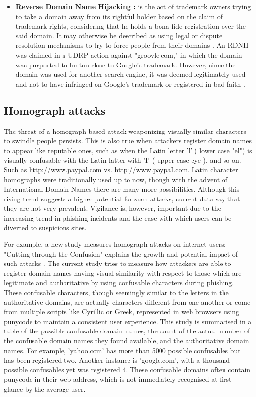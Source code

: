 \begin{itemize}
     \item \textbf{Reverse Domain Name Hijacking  :} is the act of trademark owners trying to take a domain away from its rightful holder based on the claim of trademark rights, considering that he holds a bona fide registration over the said domain. It may otherwise be described as using legal or dispute resolution mechanisms to try to force people from their domains \cite{Sun2006DomainTrademarkConflict}.  An RDNH was claimed in a UDRP action against "groovle.com," in which the domain was purported to be too close to Google's trademark. However, since the domain was used for another search engine, it was deemed legitimately used and not to have infringed on Google's trademark or registered in bad faith \cite{Singh2011ReverseDomainHijacking}.
\end{itemize}


\subsection {Homograph attacks} 

The threat of a homograph based attack weaponizing visually similar characters to swindle people persists. This is also true when attackers register domain names to appear like reputable ones, such as when the Latin letter 'l' ( lower case "el") is visually confusable with the Latin latter with 'I' ( upper case eye ), and so on. Such as http://www.paypal.com vs. http://www.paypaI.com.  Latin character homographs were traditionally used up to now, though with the advent of International Domain Names there are many more possibilities. Although this rising trend suggests a higher potential for such attacks, current data say that they are not very prevalent. Vigilance is, however, important due to the increasing trend in phishing incidents and the ease with which users can be diverted to suspicious sites.

For example, a new study measures homograph attacks on internet users: "Cutting through the Confusion" explains the growth and potential impact of such attacks \cite{holgers2006homograph}. The current study tries to measure how attackers are able to register domain names having visual similarity with respect to those which are legitimate and authoritative by using confusable characters during phishing. These confusable characters, though seemingly similar to the letters in the authoritative domains, are actually characters different from one another or come from multiple scripts like Cyrillic or Greek, represented in web browsers using punycode to maintain a consistent user experience. This study is summarised in a table of the possible confusable domain names, the count of the actual number of the confusable domain names they found available, and the authoritative domain names. For example, 'yahoo.com' has more than 5000 possible confusables but has been registered two. Another instance is 'google.com', with a thousand possible confusables yet was registered 4. These confusable domains often contain punycode in their web address, which is not immediately recognised at first glance by the average user.


